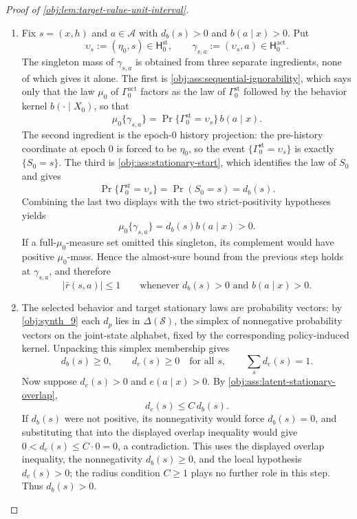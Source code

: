 \documentclass[11pt]{article}
\begin{document}
\begin{proof}[Proof of \cref{obj:lem:target-value-unit-interval}]
\begin{enumerate}
\item Fix \(s=(x,h)\) and \(a\in\mathcal A\) with \(d_b(s)>0\) and \(b(a\mid x)>0\). Put
\[
\upsilon_s:=(\eta_0,s)\in\mathsf H^{\mathrm{st}}_0,
\qquad
\gamma_{s,a}:=(\upsilon_s,a)\in\mathsf H^{\mathrm{act}}_0.
\]
The singleton mass of \(\gamma_{s,a}\) is obtained from three separate ingredients, none of which gives it alone. The first is \cref{obj:ass:sequential-ignorability}, which says only that the law \(\mu_0\) of \(\Gamma^{\mathrm{act}}_0\) factors as the law of \(\Gamma^{\mathrm{st}}_0\) followed by the behavior kernel \(b(\cdot\mid X_0)\), so that
\[
\mu_0\{\gamma_{s,a}\}
=
\Pr\{\Gamma^{\mathrm{st}}_0=\upsilon_s\}\,b(a\mid x).
\]
The second ingredient is the epoch-\(0\) history projection: the pre-history coordinate at epoch \(0\) is forced to be \(\eta_0\), so the event \(\{\Gamma^{\mathrm{st}}_0=\upsilon_s\}\) is exactly \(\{S_0=s\}\). The third is \cref{obj:ass:stationary-start}, which identifies the law of \(S_0\) and gives
\[
\Pr\{\Gamma^{\mathrm{st}}_0=\upsilon_s\}=\Pr(S_0=s)=d_b(s).
\]
Combining the last two displays with the two strict-positivity hypotheses yields
\[
\mu_0\{\gamma_{s,a}\}
=
d_b(s)b(a\mid x)>0.
\]
If a full-\(\mu_0\)-measure set omitted this singleton, its complement would have positive \(\mu_0\)-mass. Hence the almost-sure bound from the previous step holds at \(\gamma_{s,a}\), and therefore
\[
|\bar r(s,a)|\le1
\qquad
\text{whenever } d_b(s)>0 \text{ and } b(a\mid x)>0.
\]

\item The selected behavior and target stationary laws are probability vectors: by \cref{obj:synth_9} each \(d_p\) lies in \(\Delta(\mathcal S)\), the simplex of nonnegative probability vectors on the joint-state alphabet, fixed by the corresponding policy-induced kernel. Unpacking this simplex membership gives
\[
d_b(s)\ge0,
\qquad
d_e(s)\ge0
\quad\text{for all }s,
\qquad
\sum_s d_e(s)=1.
\]
Now suppose \(d_e(s)>0\) and \(e(a\mid x)>0\). By \cref{obj:ass:latent-stationary-overlap},
\[
d_e(s)\le C\,d_b(s).
\]
If \(d_b(s)\) were not positive, its nonnegativity would force \(d_b(s)=0\), and substituting that into the displayed overlap inequality would give \(0<d_e(s)\le C\cdot0=0\), a contradiction. This uses the displayed overlap inequality, the nonnegativity \(d_b(s)\ge0\), and the local hypothesis \(d_e(s)>0\); the radius condition \(C\ge1\) plays no further role in this step. Thus \(d_b(s)>0\).


\end{enumerate}
\end{proof}
\end{document}
